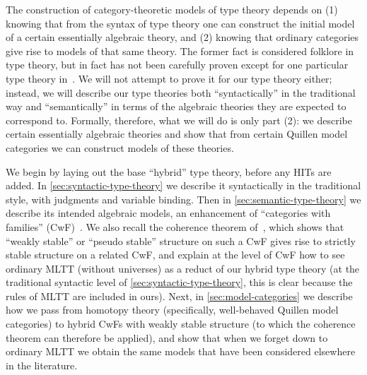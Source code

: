 \documentclass{amsart}
\begin{document}
The construction of category-theoretic models of type theory depends on (1) knowing that from the syntax of type theory one can construct the initial model of a certain essentially algebraic theory, and (2) knowing that ordinary categories give rise to models of that same theory.
The former fact is considered folklore in type theory, but in fact has not been carefully proven except for one particular type theory in~\cite{streicher:semtt}.
We will not attempt to prove it for our type theory either; instead, we will describe our type theories both ``syntactically'' in the traditional way and ``semantically'' in terms of the algebraic theories they are expected to correspond to.
Formally, therefore, what we will do is only part (2): we describe certain essentially algebraic theories and show that from certain Quillen model categories we can construct models of these theories.

We begin by laying out the base ``hybrid'' type theory, before any HITs are added.
In \cref{sec:syntactic-type-theory} we describe it syntactically in the traditional style, with judgments and variable binding.
Then in \cref{sec:semantic-type-theory} we describe its intended algebraic models, an enhancement of ``categories with families'' (CwF)~\cite{?}.
We also recall the coherence theorem of~\cite{lw:localuniv}, which shows that ``weakly stable'' or ``pseudo stable'' structure on such a CwF gives rise to strictly stable structure on a related CwF, and explain at the level of CwF how to see ordinary MLTT (without universes) as a reduct of our hybrid type theory (at the traditional syntactic level of \cref{sec:syntactic-type-theory}, this is clear because the rules of MLTT are included in ours).
Next, in \cref{sec:model-categories} we describe how we pass from homotopy theory (specifically, well-behaved Quillen model categories) to hybrid CwFs with weakly stable structure (to which the coherence theorem can therefore be applied), and show that when we forget down to ordinary MLTT we obtain the same models that have been considered elsewhere in the literature.
\end{document}

